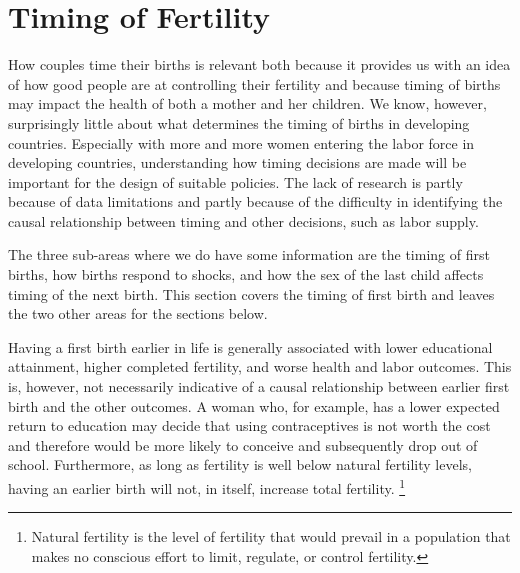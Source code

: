 \documentclass[letterpaper,12pt]{article}
\begin{document}
\section{Timing of Fertility}\label{timing-of-fertility}

How couples time their births is relevant both because it provides us
with an idea of how good people are at controlling their fertility and
because timing of births may impact the health of both a mother and her
children.
We know, however, surprisingly little about what determines the timing
of births in developing countries.
Especially with more and more women entering the labor force in
developing countries, understanding how timing decisions are made will
be important for the design of suitable policies.
The lack of research is partly because of data limitations and partly
because of the difficulty in identifying the causal relationship between
timing and other decisions, such as labor supply.

The three sub-areas where we do have some information are the timing of
first births, how births respond to shocks, and how the sex of the last
child affects timing of the next birth.
This section covers the timing of first birth and leaves the two other
areas for the sections below.

Having a first birth earlier in life is generally associated with lower
educational attainment, higher completed fertility, and worse health and
labor outcomes.
This is, however, not necessarily indicative of a causal relationship
between earlier first birth and the other outcomes.
A woman who, for example, has a lower expected return to education may
decide that using contraceptives is not worth the cost and therefore
would be more likely to conceive and subsequently drop out of school.
Furthermore, as long as fertility is well below natural fertility
levels, having an earlier birth will not, in itself, increase total
fertility.%
\footnote{
Natural fertility is the level of fertility that would prevail in a
population that makes no conscious effort to limit, regulate, or control
fertility.}
\end{document}
